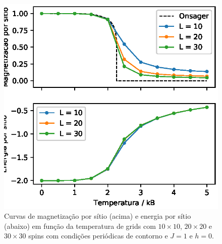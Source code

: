 \begin{figure}[ht]
	\centering
	\includegraphics[scale = 1]{./img/simulacao-3-larguras}
    \caption{Curvas de magnetização por sítio (acima) e energia por sítio (abaixo) em função da temperatura de grids com $10 \times 10$, $20 \times 20$ e $30 \times 30$ spins com condições periódicas de contorno e $J = 1$ e $h = 0$.}
    \label{fig:simulacao-3-larguras}
\end{figure}

